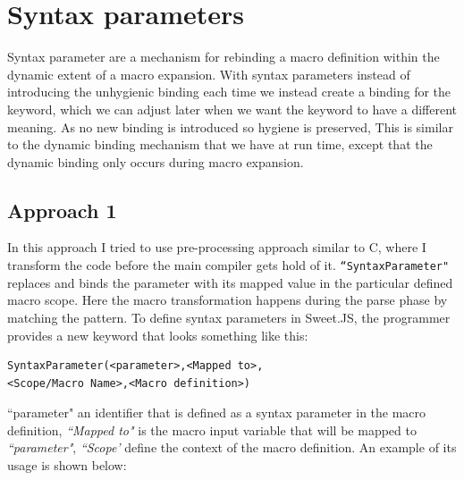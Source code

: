 \chapter{Syntax parameters}

Syntax parameter are a mechanism for rebinding a macro definition within the dynamic extent of a macro expansion. With syntax parameters instead of introducing the unhygienic binding each time we instead create a binding for the keyword, which we can adjust later when we want the keyword to have a different meaning. As no new binding is introduced so hygiene is preserved, This is similar to the dynamic binding mechanism that we have at run time, except that the dynamic binding only occurs during macro expansion.

\section{Approach 1}

In this approach I tried to use pre-processing approach similar to C, where I transform the code before the main compiler gets hold of it. \texttt{``SyntaxParameter"} replaces and binds the parameter with its mapped value in the particular defined macro scope. Here the macro transformation happens during the parse phase by matching the pattern. To define syntax parameters in Sweet.JS, the programmer provides a new keyword that looks something like this:  

\begin{lstlisting}[frame=single]
SyntaxParameter(<parameter>,<Mapped to>,
<Scope/Macro Name>,<Macro definition>)
\end{lstlisting}

``parameter" an identifier that is defined as a syntax parameter in the macro definition, \textit{``Mapped to"} is the macro input variable that will be mapped to \textit{``parameter"}, \textit{``Scope'} define the context of the macro definition.
\newpage
An example of its usage is shown below:

